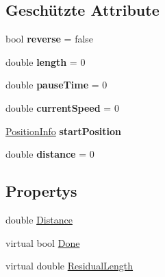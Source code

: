 \subsection*{Geschützte Attribute}
\begin{DoxyCompactItemize}
\item 
\hypertarget{class_robot_ctrl_1_1_track_a98f9e9a8f087b8c7770d8f8320d821c5}{
bool {\bfseries reverse} = false}
\label{class_robot_ctrl_1_1_track_a98f9e9a8f087b8c7770d8f8320d821c5}

\item 
\hypertarget{class_robot_ctrl_1_1_track_ad4fd8df6c4813180fe764d327a9a9af8}{
double {\bfseries length} = 0}
\label{class_robot_ctrl_1_1_track_ad4fd8df6c4813180fe764d327a9a9af8}

\item 
\hypertarget{class_robot_ctrl_1_1_track_a98771bf28c921adf67e6df981dcf8e2a}{
double {\bfseries pauseTime} = 0}
\label{class_robot_ctrl_1_1_track_a98771bf28c921adf67e6df981dcf8e2a}

\item 
\hypertarget{class_robot_ctrl_1_1_track_ac8722c422d19d4b18430b106275bc9f9}{
double {\bfseries currentSpeed} = 0}
\label{class_robot_ctrl_1_1_track_ac8722c422d19d4b18430b106275bc9f9}

\item 
\hypertarget{class_robot_ctrl_1_1_track_a731b5abc7baa77c51b72c5dea7cbfba8}{
\hyperlink{struct_robot_ctrl_1_1_position_info}{PositionInfo} {\bfseries startPosition}}
\label{class_robot_ctrl_1_1_track_a731b5abc7baa77c51b72c5dea7cbfba8}

\item 
\hypertarget{class_robot_ctrl_1_1_track_aea67643a40f2cce540482512d219dcce}{
double {\bfseries distance} = 0}
\label{class_robot_ctrl_1_1_track_aea67643a40f2cce540482512d219dcce}

\end{DoxyCompactItemize}
\subsection*{Propertys}
\begin{DoxyCompactItemize}
\item 
double \hyperlink{class_robot_ctrl_1_1_track_a42bb46c8d3c2a540b1d3d25e65b1a07c}{Distance}
\item 
virtual bool \hyperlink{class_robot_ctrl_1_1_track_ad1c4864f7171475914ef5c0111a0d901}{Done}
\item 
virtual double \hyperlink{class_robot_ctrl_1_1_track_a4f01da358c21733d43ac272d3fb549cc}{ResidualLength}
\end{DoxyCompactItemize}


